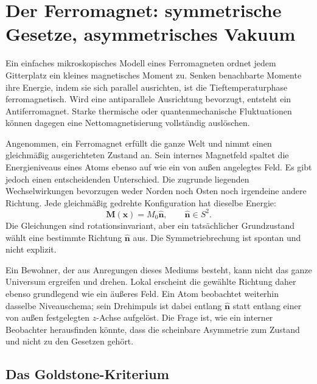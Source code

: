 \section{Der Ferromagnet: symmetrische Gesetze, asymmetrisches Vakuum}

Ein einfaches mikroskopisches Modell eines Ferromagneten ordnet jedem Gitterplatz ein kleines magnetisches Moment zu. Senken benachbarte Momente ihre Energie, indem sie sich parallel ausrichten, ist die Tieftemperaturphase ferromagnetisch. Wird eine antiparallele Ausrichtung bevorzugt, entsteht ein Antiferromagnet. Starke thermische oder quantenmechanische Fluktuationen können dagegen eine Nettomagnetisierung vollständig auslöschen.

Angenommen, ein Ferromagnet erfüllt die ganze Welt und nimmt einen gleichmäßig ausgerichteten Zustand an. Sein internes Magnetfeld spaltet die Energieniveaus eines Atoms ebenso auf wie ein von außen angelegtes Feld. Es gibt jedoch einen entscheidenden Unterschied. Die zugrunde liegenden Wechselwirkungen bevorzugen weder Norden noch Osten noch irgendeine andere Richtung. Jede gleichmäßig gedrehte Konfiguration hat dieselbe Energie:
\begin{equation}
\mathbf M(\mathbf x)=M_0\hat{\mathbf n},
\qquad
\hat{\mathbf n}\in S^2.
\label{eq:l9-ferromagnetic-vacua}
\end{equation}
Die Gleichungen sind rotationsinvariant, aber ein tatsächlicher Grundzustand wählt eine bestimmte Richtung \(\hat{\mathbf n}\) aus. Die Symmetriebrechung ist spontan und nicht explizit.

Ein Bewohner, der aus Anregungen dieses Mediums besteht, kann nicht das ganze Universum ergreifen und drehen. Lokal erscheint die gewählte Richtung daher ebenso grundlegend wie ein äußeres Feld. Ein Atom beobachtet weiterhin dasselbe Niveauschema; sein Drehimpuls ist dabei entlang \(\hat{\mathbf n}\) statt entlang einer von außen festgelegten \(z\)-Achse aufgelöst. Die Frage ist, wie ein interner Beobachter herausfinden könnte, dass die scheinbare Asymmetrie zum Zustand und nicht zu den Gesetzen gehört.

\subsection{Das Goldstone-Kriterium}

